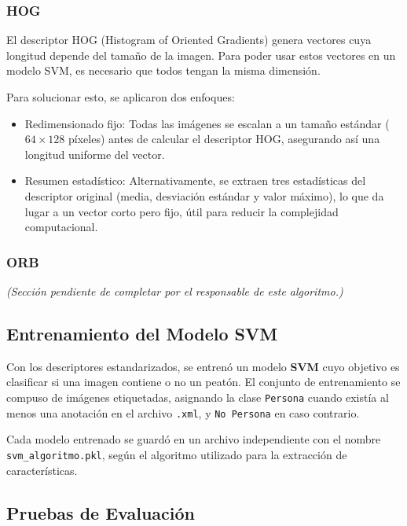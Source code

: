 \documentclass[a4paper]{article}
\begin{document}
\subsubsection*{HOG}

El descriptor HOG (Histogram of Oriented Gradients) genera vectores cuya longitud depende del tamaño de la imagen. 
Para poder usar estos vectores en un modelo SVM, es necesario que todos tengan la misma dimensión.

Para solucionar esto, se aplicaron dos enfoques:
\begin{itemize}
    \item Redimensionado fijo: Todas las imágenes se escalan a un tamaño estándar (\(64\times128\) píxeles) antes de calcular el descriptor HOG, asegurando así una longitud uniforme del vector.
    \item Resumen estadístico: Alternativamente, se extraen tres estadísticas del descriptor original (media, desviación estándar y valor máximo), lo que da lugar a un vector corto pero fijo, útil para reducir la complejidad computacional.
\end{itemize}


\subsubsection*{ORB}

\textit{(Sección pendiente de completar por el responsable de este algoritmo.)}



\subsection{Entrenamiento del Modelo SVM}

Con los descriptores estandarizados, se entrenó un modelo \textbf{SVM} cuyo objetivo es clasificar si una imagen contiene o no un peatón. El conjunto de entrenamiento se compuso de imágenes etiquetadas, asignando la clase \texttt{Persona} cuando existía al menos una anotación en el archivo \texttt{.xml}, y \texttt{No Persona} en caso contrario.

\par\vspace{0.5cm}

Cada modelo entrenado se guardó en un archivo independiente con el nombre \texttt{svm\_algoritmo.pkl}, según el algoritmo utilizado para la extracción de características.

\subsection{Pruebas de Evaluación}
\end{document}

